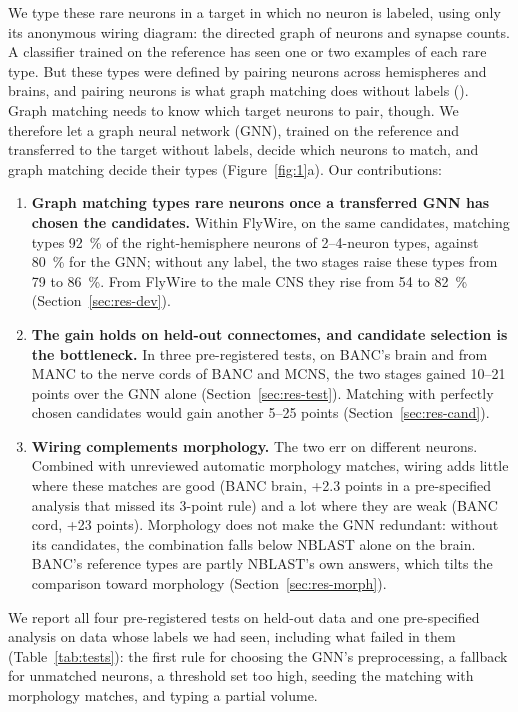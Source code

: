 \documentclass[11pt,a4paper]{article}
\begin{document}
We type these rare neurons in a target in which no neuron is labeled, using only its anonymous wiring diagram: the directed graph of neurons and synapse counts. A classifier trained on the reference has seen one or two examples of each rare type. But these types were defined by pairing neurons across hemispheres and brains, and pairing neurons is what graph matching does without labels (\citealp{pedigo2023}). Graph matching needs to know which target neurons to pair, though. We therefore let a graph neural network (GNN), trained on the reference and transferred to the target without labels, decide which neurons to match, and graph matching decide their types (Figure~\ref{fig:1}a). Our contributions:

\begin{enumerate}[leftmargin=*,itemsep=2pt]

\item \textbf{Graph matching types rare neurons once a transferred GNN has chosen the candidates.} Within FlyWire, on the same candidates, matching types 92~\% of the right-hemisphere neurons of 2–4-neuron types, against 80~\% for the GNN; without any label, the two stages raise these types from 79 to 86~\%. From FlyWire to the male CNS they rise from 54 to 82~\% (Section~\ref{sec:res-dev}).

\item \textbf{The gain holds on held-out connectomes, and candidate selection is the bottleneck.} In three pre-registered tests, on BANC's brain and from MANC to the nerve cords of BANC and MCNS, the two stages gained 10–21 points over the GNN alone (Section~\ref{sec:res-test}). Matching with perfectly chosen candidates would gain another 5–25 points (Section~\ref{sec:res-cand}).

\item \textbf{Wiring complements morphology.} The two err on different neurons. Combined with unreviewed automatic morphology matches, wiring adds little where these matches are good (BANC brain, +2.3 points in a pre-specified analysis that missed its 3-point rule) and a lot where they are weak (BANC cord, +23 points). Morphology does not make the GNN redundant: without its candidates, the combination falls below NBLAST alone on the brain. BANC's reference types are partly NBLAST's own answers, which tilts the comparison toward morphology (Section~\ref{sec:res-morph}).

\end{enumerate}

We report all four pre-registered tests on held-out data and one pre-specified analysis on data whose labels we had seen, including what failed in them (Table~\ref{tab:tests}): the first rule for choosing the GNN's preprocessing, a fallback for unmatched neurons, a threshold set too high, seeding the matching with morphology matches, and typing a partial volume.
\end{document}
